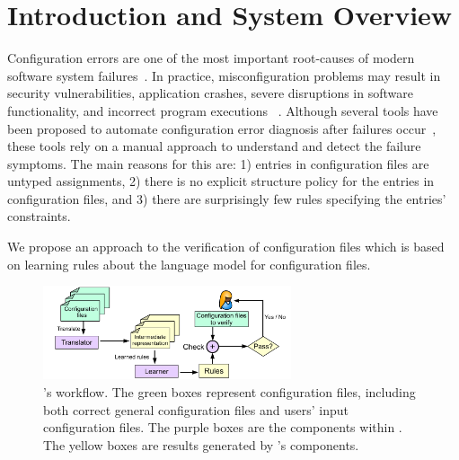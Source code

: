 \section{Introduction and System Overview}
\label{sec:Intro}

Configuration errors are one of the most important root-causes of
modern software system failures~\cite{xu15systems,yin11anempirical}.
In practice, misconfiguration problems may result in security
vulnerabilities, application crashes, severe disruptions in software
functionality, and incorrect program executions%
~\cite{xu15systems,zhang14encore,yuan11context}.  Although several
tools have been proposed to automate configuration error diagnosis
after failures occur~\cite{wang04automatic,attariyan10automating,
su07autobash,whitaker04configuration}, these tools rely on a manual approach
  to understand and detect the failure symptoms. The main reasons for this are:
  1) entries in configuration files are untyped assignments, 2) there
  is no explicit structure policy for the entries in configuration
  files, and 3) there are surprisingly few rules specifying the
  entries' constraints.

We propose an approach to the verification of  
configuration files which is based on learning rules about the language 
model for configuration files. 

\begin{figure}[t] \centering
\includegraphics[width=0.65\textwidth]{figs/overview}
\caption{{\footnotesize \app's workflow. The green boxes represent configuration files,
  including both correct general configuration files and users' input
  configuration files. The purple boxes are the components within \app.
  The yellow boxes are results generated by \app's components.}}
\label{fig-overview}
\end{figure}

